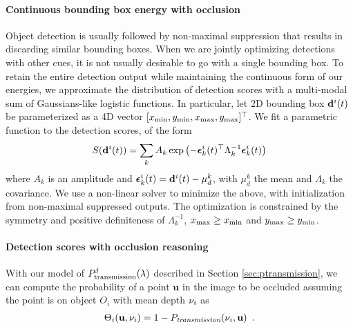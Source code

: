 \vspace{-0.3cm}
\paragraph{Continuous bounding box energy with occlusion}
Object detection is usually followed by non-maximal suppression that results in discarding similar bounding boxes. When we are jointly optimizing detections with other cues, it is not usually desirable to go with a single bounding box. To retain the entire detection output while maintaining the continuous form of our energies, we approximate the distribution of detection scores with a multi-modal sum of Gaussians-like logistic functions. In particular, let 2D bounding box $\mathbf{d}^{i}(t)$ be parameterized as a 4D vector $[x_{\text{min}}, y_{\text{min}}, x_{\text{max}}, y_{\text{max}}]^\top$. We fit a parametric function to the detection scores, of the form
\begin{equation}
S(\mathbf{d}^{i}(t)) = \sum_k A_k \exp \left( -{\bm{\epsilon}}_k^{i}(t)^\top \Lambda_k^{-1} {\bm{\epsilon}}_k^{i}(t) \right)
\end{equation}
where $A_k$ is an amplitude and ${\bm{\epsilon}}_k^{i}(t) = \mathbf{d}^{i}(t)-\mu^{k}_d$, with $\mu^{k}_d$ the mean and $\Lambda_k$ the covariance.
We use a non-linear solver to minimize the above, with initialization from non-maximal suppressed outputs. The optimization is constrained by the symmetry and positive definiteness of $\Lambda_k^{-1}$, $x_{\text{max}} \ge x_{\text{min}}$ and $y_{\text{max}} \ge y_{\text{min}}$.

\paragraph{Detection scores with occlusion reasoning} 
\def\u{\mathbf{u}}
With our model of $P^{j}_{\text{transmission}}(\lambda)$ described in Section \ref{sec:ptransmission}, we can
compute the probability of a point $\u$ in the image to be occluded assuming
the point is on object $O_i$ with mean depth $\nu_i$ as
\begin{align}
  \Theta_{i}(\u, \meandepth{i}) = 1 - \Ptransmission(\meandepth{i}, \u) \enspace .
\end{align}


